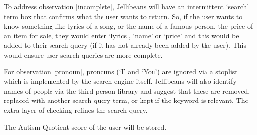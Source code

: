 \documentclass[a4paper, 11pt]{article}
\begin{document}
\vspace{5mm} %
To address observation \ref{incomplete}, Jellibeans will have an intermittent `search' term box that confirms what the user wants to return. So, if the user wants to know something like lyrics of a song, or the name of a famous person, the price of an item for sale, they would enter `lyrics', `name' or `price' and this would be added to their search query (if it has not already been added by the user). This would ensure user search queries are more complete.

\vspace{5mm} %
For observation \ref{pronoun}, pronouns (`I' and `You') are ignored via a stoplist which is implemented by the search engine itself. Jellibeans will also identify names of people via the third person library and suggest that these are removed, replaced with another search query term, or kept if the keyword is relevant. The extra layer of checking refines the search query.

\vspace{5mm} %

The Autism Quotient score of the user will be stored.
\end{document}
